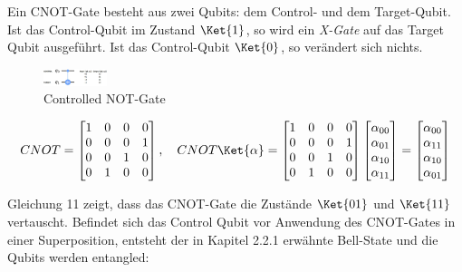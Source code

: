 Ein CNOT-Gate besteht aus zwei Qubits: dem Control- und dem Target-Qubit. Ist das Control-Qubit im Zustand \(\Ket{1}\), so wird ein \textit{X-Gate} auf das Target Qubit ausgeführt. Ist das Control-Qubit \(\Ket{0}\), so verändert sich nichts.

\begin{figure}
    \centering
    \includegraphics[width=70]{content/CNOT.JPG}
    \caption{Controlled NOT-Gate}
    \label{fig:cnot}
\end{figure}

\begin{equation}
    CNOT = \begin{bmatrix} 1 & 0 & 0 & 0 \\ 0 & 0 & 0 & 1 \\ 0 & 0 & 1 & 0 \\ 0 & 1 & 0 & 0 \\  \end{bmatrix}, \quad
    CNOT\Ket{\alpha} = \begin{bmatrix} 1 & 0 & 0 & 0 \\ 0 & 0 & 0 & 1 \\ 0 & 0 & 1 & 0 \\ 0 & 1 & 0 & 0 \\  \end{bmatrix} \begin{bmatrix} \alpha_{00} \\ \alpha_{01} \\ \alpha_{10}\\ \alpha_{11} \\  \end{bmatrix} = \begin{bmatrix} \alpha_{00} \\ \alpha_{11} \\ \alpha_{10}\\ \alpha_{01} \\  \end{bmatrix}
\end{equation}

Gleichung 11 zeigt, dass das CNOT-Gate die Zustände \(\Ket{01}\) und \(\Ket{11}\) vertauscht. Befindet sich das Control Qubit vor Anwendung des CNOT-Gates in einer Superposition, entsteht der in Kapitel 2.2.1 erwähnte Bell-State und die Qubits werden entangled:

